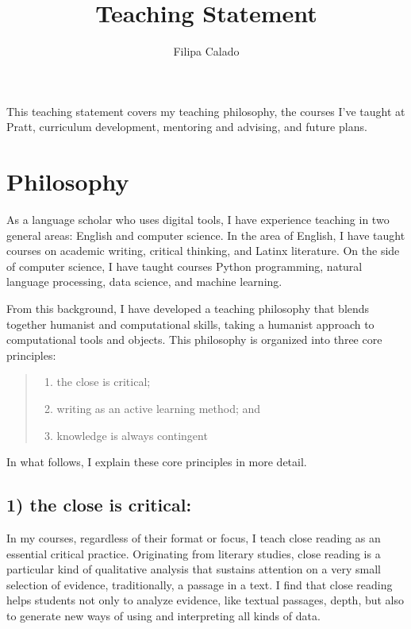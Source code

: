 \documentclass[12pt]{article}
\author{Filipa Calado}
\date{}
\title{Teaching Statement}
\makeatletter
\renewcommand{\maketitle}{%
\begin{center}
{\LARGE\@title\par}
\vspace{0.5em}
{\large\@author\par}
\vspace{0.5em}
{\large\@date\par}
\end{center}
}
\makeatother
\begin{document}
\maketitle
This teaching statement covers my teaching philosophy, the courses
I've taught at Pratt, curriculum development, mentoring and advising,
and future plans.

\section*{Philosophy}
\label{sec:org53c0d97}
As a language scholar who uses digital tools, I have experience
teaching in two general areas: English and computer science. In the
area of English, I have taught courses on academic writing, critical
thinking, and Latinx literature. On the side of computer science, I
have taught courses Python programming, natural language processing,
data science, and machine learning.

From this background, I have developed a teaching philosophy that
blends together humanist and computational skills, taking a humanist
approach to computational tools and objects. This philosophy is
organized into three core principles:

\begin{quote}
\begin{enumerate}
\item the close is critical;
\item writing as an active learning method; and
\item knowledge is always contingent
\end{enumerate}
\end{quote}

In what follows, I explain these core principles in more detail.
\subsection*{1) the close is critical:}
\label{sec:org5023f0f}
In my courses, regardless of their format or focus, I teach close
reading as an essential critical practice. Originating from literary
studies, close reading is a particular kind of qualitative analysis
that sustains attention on a very small selection of evidence,
traditionally, a passage in a text. I find that close reading helps
students not only to analyze evidence, like textual passages, depth,
but also to generate new ways of using and interpreting all kinds of
data.
\end{document}

